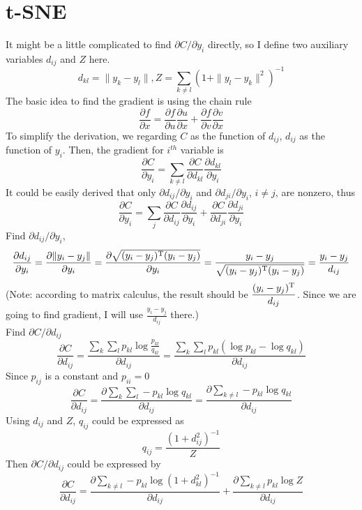 \documentclass[11pt]{article}
\begin{document}
\section{t-SNE}
It might be a little complicated to find $\partial{C}/\partial{y_i}$ directly, 
so I define two auxiliary variables $d_{ij}$ and $Z$ here. \cite{maaten2008visualizing}
$$
    d_{kl} = \|y_k - y_l\|, Z = \sum_{k\neq l} (1+\|y_l - y_k\|^2)^{-1}
$$
The basic idea to find the gradient is using the chain rule
$$
\frac{\partial{f}}{\partial{x}} = \frac{\partial{f}}{\partial{u}}\frac{\partial{u}}{\partial{x}} + 
\frac{\partial{f}}{\partial{v}}\frac{\partial{v}}{\partial{x}}
$$
To simplify the derivation, we regarding $C$ as the function of $d_{ij}$, $d_{ij}$ as the function of $y_i$. 
Then, the gradient for $i^{th}$ variable is
$$
\frac{\partial{C}}{\partial{y_i}} = \sum_{k\neq l} \frac{\partial{C}}{\partial{d_{kl}}}
\frac{\partial{d_{kl}}}{\partial{y_i}}
$$
It could be easily derived that only $\partial d_{ij}/\partial y_i$ and $\partial d_{ji}/\partial y_i$, $i\neq j$, 
are nonzero, thus
$$
\frac{\partial{C}}{\partial{y_i}} = \sum_j \frac{\partial{C}}{\partial{d_{ij}}}
\frac{\partial{d_{ij}}}{\partial{y_i}} +\frac{\partial{C}}{\partial{d_{ji}}}
\frac{\partial{d_{ji}}}{\partial{y_i}}
$$
Find $\partial{d_{ij}}/\partial{y_i}$, 
$$
\frac{\partial{d_{ij}}}{\partial{y_i}} = \frac{\partial{\|y_i - y_j\|}}{\partial{y_i}} = 
\frac{\partial\sqrt{(y_i-y_j)^{\rm T}(y_i-y_j)}}{\partial{y_i}} = \frac{y_i-y_j}
{\sqrt{(y_i-y_j)^{\rm T}(y_i-y_j)}} = \frac{y_i-y_j}{d_{ij}}
$$
(Note: according to matrix calculus, the result should be $\displaystyle\frac{(y_i-y_j)^{\rm T}}{d_{ij}}$.
Since we are going to find gradient, I will use $\displaystyle\frac{y_i-y_j}{d_{ij}}$ there.) \\
Find $\partial C/\partial d_{ij}$
$$
\frac{\partial C}{\partial d_{ij}} = \frac{\sum_k \sum_l p_{kl} \log\frac{p_{kl}}{q_{kl}}}
{\partial d_{ij}} = \frac{\sum_k\sum_l p_{kl}(\log p_{kl} - \log q_{kl})}{\partial d_{ij}}
$$
Since $p_{ij}$ is a constant and $p_{ii}=0$
$$
\frac{\partial C}{\partial d_{ij}} = \frac{\partial{\sum_k\sum_l -p_{kl}\log q_{kl}}}{\partial d_{ij}} = 
\frac{\partial\sum_{k\neq l}-p_{kl}\log q_{kl}}{\partial d_{ij}}
$$
Using $d_{ij}$ and $Z$, $q_{ij}$ could be expressed as
$$
    q_{ij} = \frac{(1+d_{ij}^2)^{-1}}{Z}
$$
Then $\partial C/\partial d_{ij}$ could be expressed by
$$
\frac{\partial C}{\partial d_{ij}} = \frac{\partial \sum_{k\neq l}-p_{kl}\log(1+d_{kl}^2)^{-1}}{\partial d_{ij}} + 
\frac{\partial \sum_{k\neq l} p_{kl}\log Z}{\partial d_{ij}}
$$
\end{document}
